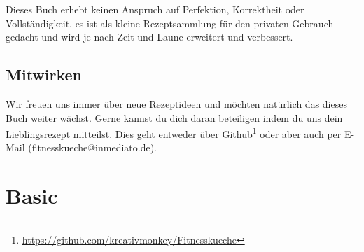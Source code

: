 \documentclass[a4paper]{scrartcl}
\begin{document}
Dieses Buch erhebt keinen Anspruch auf Perfektion, Korrektheit oder Vollständigkeit, es ist als kleine Rezeptsammlung für den privaten Gebrauch gedacht und wird je nach Zeit und Laune erweitert und verbessert.

\subsection*{Mitwirken}
Wir freuen uns immer über neue Rezeptideen und möchten natürlich das dieses Buch weiter wächst. Gerne kannst du dich daran beteiligen indem du uns dein Lieblingsrezept mitteilst. Dies geht entweder über Github\footnote{\url{https://github.com/kreativmonkey/Fitnesskueche}} oder aber auch per E-Mail (fitnesskueche@inmediato.de). 

%
%
%
\printnomenclature



\section{Basic} %



%






\end{document}
